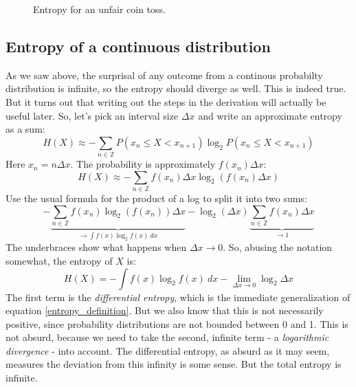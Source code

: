 \documentclass[12pt, a4paper]{article}
\numberwithin{equation}{section}
\begin{document}
\begin{figure}
\centering
{}
\caption{Entropy for an unfair coin toss.}
\label{fig:coin_entropy}
\end{figure}

\subsection{Entropy of a continuous distribution}
\label{continous_entropy}
As we saw above, the surprisal of any outcome from a continous probabilty distribution is infinite, so the entropy should diverge as well. This is indeed true. But it turns out that writing out the steps in the derivation will actually be useful later. So, let's pick an interval size $\Delta x$ and write an approximate entropy as a sum:
\begin{equation}
H(X)\approx -\sum_{n\in\mathbb{Z}}P(x_n\le X<x_{n+1})\log_2 P(x_n\le X<x_{n+1})
\end{equation}
Here $x_n=n\Delta x$. The probability is approximately $f(x_n)\Delta x$:
\begin{equation}
H(X)\approx -\sum_{n\in\mathbb{Z}}f(x_n)\Delta x\log_2(f(x_n)\Delta x)
\end{equation}
Use the usual formula for the product of a log to split it into two sums:
\begin{equation}
-\underbrace{\sum_{n\in\mathbb{Z}}f(x_n)\log_2(f(x_n))\Delta x}_{\rightarrow\int f(x)\log_2 f(x)\ dx}-\log_2(\Delta x)\underbrace{\sum_{n\in\mathbb{Z}}f(x_n)\Delta x}_{\rightarrow 1}
\end{equation}
The underbraces show what happens when $\Delta x\rightarrow 0$. So, abusing the notation somewhat, the entropy of $X$ is:
\begin{equation}
H(X)=-\int f(x)\log_2 f(x)\ dx-\lim_{\Delta x\rightarrow 0}\log_2\Delta x
\end{equation}
The first term is the \textit{differential entropy}, which is the immediate generalization of equation \ref{entropy_definition}. But we also know that this is not necessarily positive, since probability distributions are not bounded between 0 and 1. This is not absurd, because we need to take the second, infinite term - a \textit{logarithmic divergence} - into account. The differential entropy, as absurd as it may seem, measures the deviation from this infinity is some sense. But the total entropy is infinite.
\end{document}
